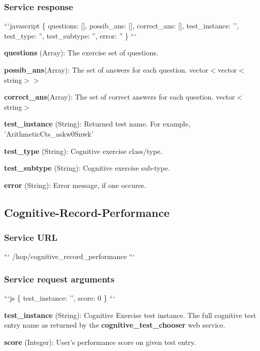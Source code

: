 \subsubsection*{Service response}

```javascript \{ questions\-: \mbox{[}\mbox{]}, possib\-\_\-ans\-: \mbox{[}\mbox{]}, correct\-\_\-ans\-: \mbox{[}\mbox{]}, test\-\_\-instance\-: '', test\-\_\-type\-: '', test\-\_\-subtype\-: '', error\-: '' \} ```


\begin{DoxyItemize}
\item {\bfseries questions} (Array)\-: The exercise set of questions.
\item {\bfseries possib\-\_\-ans}(Array)\-: The set of answers for each question. vector$<$vector$<$string$>$$>$
\item {\bfseries correct\-\_\-ans}(Array)\-: The set of correct answers for each question. vector$<$string$>$
\item {\bfseries test\-\_\-instance} (String)\-: Returned test name. For example, 'Arithmetic\-Cts\-\_\-askw0\-Snwk'
\item {\bfseries test\-\_\-type} (String)\-: Cognitive exercise class/type.
\item {\bfseries test\-\_\-subtype} (String)\-: Cognitive exercise sub-\/type.
\item {\bfseries error} (String)\-: Error message, if one occures.
\end{DoxyItemize}

\subsection*{Cognitive-\/\-Record-\/\-Performance}

\subsubsection*{Service U\-R\-L}

``` /hop/cognitive\-\_\-record\-\_\-performance ```

\subsubsection*{Service request arguments}

```js \{ test\-\_\-instance\-: '', score\-: 0 \} ```


\begin{DoxyItemize}
\item {\bfseries test\-\_\-instance} (String)\-: Cognitive Exercise test instance. The full cognitive test entry name as returned by the {\bfseries cognitive\-\_\-test\-\_\-chooser} web service.
\item {\bfseries score} (Integer)\-: User's performance score on given test entry.
\end{DoxyItemize}

